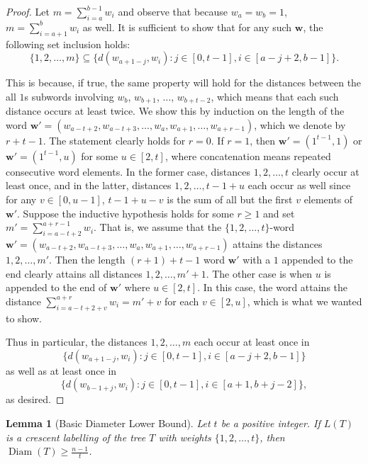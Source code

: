 \documentclass[12]{article}
\DeclareMathOperator{\diam}{Diam}
\newtheorem{lem}{Lemma} %
\theoremstyle{definition}
\begin{document}
	\begin{proof}
		Let $m = \sum_{i = a}^{b-1}w_i$ and observe that because $w_a = w_b = 1$, $m = \sum_{i = a+1}^{b}w_i$ as well.  It is sufficient to show that for any such $\mathbf{w}$, the following set inclusion holds: 
		$$\{1,2,\ldots, m\} \subseteq \{d(w_{a+1-j},w_i): j \in [0,t-1], i \in [a-j+2,b-1]\}.$$
		
		This is because, if true, the same property will hold for the distances between the all $1$s subwords involving $w_{b}$, $w_{b+1}$, $\ldots$, $w_{b+t-2}$, which means that each such distance occurs at least twice.  We show this by induction on the length of the word $\mathbf{w}' = (w_{a-t+2},w_{a-t+3}, \ldots, w_{a}, w_{a+1}, \ldots, w_{a+r-1})$, which we denote by $r+t-1$.  The statement clearly holds for $r=0$.  If $r=1$, then $\mathbf{w}' = (1^{t-1},1)$ or $\mathbf{w}' = (1^{t-1},u)$ for some $u \in [2,t]$, where concatenation means repeated consecutive word elements.  In the former case, distances $1,2, \ldots, t$ clearly occur at least once, and in the latter, distances $1,2, \ldots, t-1+u$ each occur as well since for any $v \in [0,u-1]$, $t-1+u-v$ is the sum of all but the first $v$ elements of $\mathbf{w}'$.  Suppose the inductive hypothesis holds for some $r \geq 1$ and set $m' = \sum_{i=a-t+2}^{a+r-1}w_i$.  That is, we assume that the $\{1,2, \ldots, t\}$-word $\mathbf{w}' = (w_{a-t+2}, w_{a-t+3}, \ldots, w_a,w_{a+1}, \ldots, w_{a+r-1})$ attains the distances $1,2,\ldots, m'$.  Then the length $(r+1)+t-1$ word $\mathbf{w}'$ with a $1$ appended to the end clearly attains all distances $1,2,\ldots, m'+1$.  The other case is when $u$ is appended to the end of $\mathbf{w}'$ where $u \in [2,t]$.  In this case, the word attains the distance $\sum_{i=a-t+2+v}^{a+r}w_i = m'+v$ for each $v \in [2,u]$, which is what we wanted to show.
		
		Thus in particular, the distances $1,2, \ldots, m$ each occur at least once in 
		$$\{d(w_{a+1-j},w_i): j \in [0,t-1], i \in [a-j+2,b-1]\}$$
		as well as at least once in 
		$$\{d(w_{b-1+j},w_i): j \in [0,t-1], i \in [a+1,b+j-2]\},$$
		as desired. \qedhere
	\end{proof}

\begin{lem}[Basic Diameter Lower Bound]
	Let $t$ be a positive integer.  If $L(T)$ is a crescent labelling of the tree $T$ with weights $\{1,2,\ldots,t\}$, then $\diam(T) \geq \tfrac{n-1}{t}$.
\end{lem}
\end{document}
